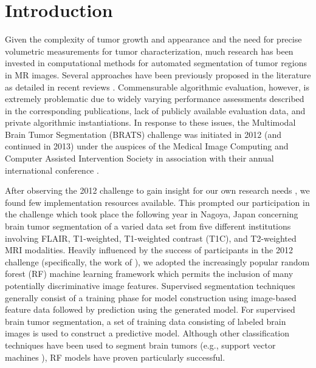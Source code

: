 \section{Introduction}

Given the complexity of tumor growth and appearance and the need
for precise volumetric measurements for tumor characterization, 
much research has been invested in computational methods for 
automated segmentation of tumor regions in MR images.  Several 
approaches have been previously proposed in the literature as
detailed in recent reviews \citep{angelini2007,bauer2013}.  
Commensurable algorithmic evaluation, however, is
extremely problematic due to widely varying performance assessments
described in the corresponding publications, lack of publicly available 
evaluation data, and private algorithmic instantiations.  
In response to these issues, the Multimodal Brain Tumor Segmentation 
(BRATS) challenge was initiated in 2012 (and continued in 2013) under 
the auspices of the Medical Image Computing and Computer Assisted 
Intervention Society in association with their annual international 
conference \citep{menze2014}.

After observing the 2012 challenge to gain insight for our own research 
needs \citep{durst2014}, we found few implementation resources available.
  This prompted our participation in the challenge which took place
the following year in Nagoya, Japan concerning brain tumor segmentation
of a varied data set from five different institutions involving FLAIR, 
T1-weighted, T1-weighted contrast (T1C), and T2-weighted MRI modalities.  Heavily influenced by the success 
of participants in the 2012 challenge (specifically, the work of 
\cite{bauer2012,geremia2012,zikic2012}), we adopted the increasingly popular 
random forest (RF) machine learning framework \citep{breiman2001} which 
permits the inclusion of many potentially discriminative image features.  
Supervised segmentation techniques generally consist of a training phase
for model construction using image-based feature data followed by prediction using the 
generated model.  For supervised brain tumor segmentation, 
a set of training data consisting of labeled brain images 
is used to construct a predictive model.  Although other 
classification techniques have been used to segment
brain tumors (e.g., support vector machines \citep{bauer2011}),
RF models have proven particularly successful.

